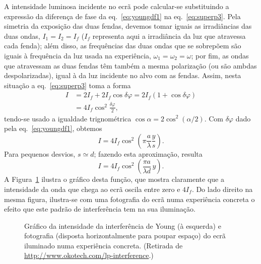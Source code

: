 A intensidade luminosa incidente no ecrã pode calcular-se substituindo a
expressão da diferença de fase da eq.~\eqref{eq:youngdf1} na
eq.~\eqref{eq:superp3}. Pela simetria da exposição das duas fendas, devemos
tomar iguais as irradiâncias das duas ondas, $I_1=I_2=I_f$ ($I_f$ representa
aqui a irradiância da luz que atravessa cada fenda); além disso, as frequências
das duas ondas que se sobrepõem são iguais à frequência da luz usada na
experiência, $\omega_1=\omega_2=\omega$; por fim, as ondas que atravessam as
duas fendas têm também a mesma polarização (ou são ambdas despolarizadas), igual
à da luz incidente no alvo com as fendas. Assim, nesta situação a
eq.~\eqref{eq:superp3} toma a forma
\begin{align*}
I&=2I_f+2I_f\cos\delta\varphi=
  2I_f(1+\cos\delta\varphi)\\&=4I_f\cos^2\frac{\delta\varphi}{2},
\end{align*}
tendo-se usado a igualdade trignométrica $\cos\alpha=2\cos^2(\alpha/2)$. Com
$\delta\varphi$ dado pela eq.~\eqref{eq:youngdf1}, obtemos
\begin{equation*}
I=4I_f\cos^2\left(\pi\frac{a}{\lambda}\frac{y}{s}\right).
\end{equation*}
Para pequenos desvios, $s\simeq d$; fazendo esta aproximação, resulta
\begin{equation}\label{eq:youngint}
I=4I_f\cos^2\left(\frac{\pi a}{\lambda d}\, y\right).
\end{equation}
A Figura~\ref{fig:yngint} ilustra o gráfico desta função, que mostra
claramente que a intensidade da onda que chega ao ecrã oscila entre zero e
$4I_f$. Do lado direito na mesma figura, ilustra-se com uma fotografia do ecrã
numa experiência concreta o efeito que este padrão de interferência tem na sua
iluminação.
\begin{figure}[htb]
  {\centering
  \par}
  \caption{\label{fig:yngint}Gráfico da intensidade da interferência de Young (à
    esquerda) e fotografia (disposta horizontalmente para poupar espaço) do
    ecrã iluminado numa experiência concreta.  (Retirada de
    \protect\url{http://www.okotech.com/lp-interference}.)}
\end{figure}

